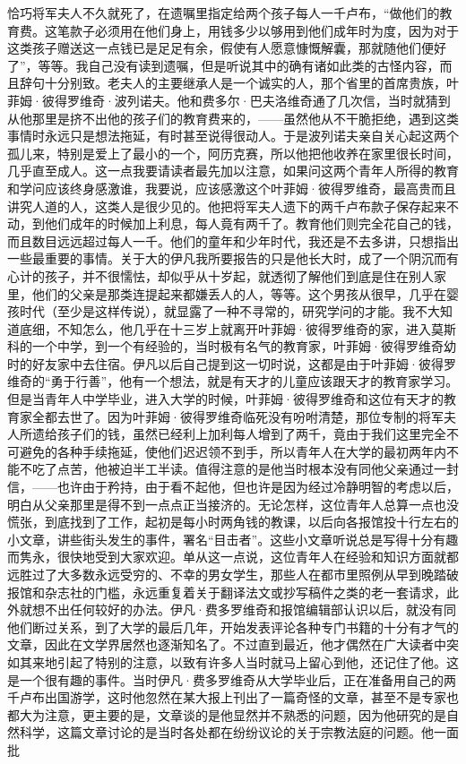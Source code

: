 \par 恰巧将军夫人不久就死了，在遗嘱里指定给两个孩子每人一千卢布，“做他们的教育费。这笔款子必须用在他们身上，用钱多少以够用到他们成年时为度，因为对于这类孩子赠送这一点钱已是足足有余，假使有人愿意慷慨解囊，那就随他们便好了”，等等。我自己没有读到遗嘱，但是听说其中的确有诸如此类的古怪内容，而且辞句十分别致。老夫人的主要继承人是一个诚实的人，那个省里的首席贵族，叶菲姆·彼得罗维奇·波列诺夫。他和费多尔·巴夫洛维奇通了几次信，当时就猜到从他那里是挤不出他的孩子们的教育费来的，——虽然他从不干脆拒绝，遇到这类事情时永远只是想法拖延，有时甚至说得很动人。于是波列诺夫亲自关心起这两个孤儿来，特别是爱上了最小的一个，阿历克赛，所以他把他收养在家里很长时间，几乎直至成人。这一点我要请读者最先加以注意，如果问这两个青年人所得的教育和学问应该终身感激谁，我要说，应该感激这个叶菲姆·彼得罗维奇，最高贵而且讲究人道的人，这类人是很少见的。他把将军夫人遗下的两千卢布款子保存起来不动，到他们成年的时候加上利息，每人竟有两千了。教育他们则完全花自己的钱，而且数目远远超过每人一千。他们的童年和少年时代，我还是不去多讲，只想指出一些最重要的事情。关于大的伊凡我所要报告的只是他长大时，成了一个阴沉而有心计的孩子，并不很懦怯，却似乎从十岁起，就透彻了解他们到底是住在别人家里，他们的父亲是那类连提起来都嫌丢人的人，等等。这个男孩从很早，几乎在婴孩时代（至少是这样传说），就显露了一种不寻常的，研究学问的才能。我不大知道底细，不知怎么，他几乎在十三岁上就离开叶菲姆·彼得罗维奇的家，进入莫斯科的一个中学，到一个有经验的，当时极有名气的教育家，叶菲姆·彼得罗维奇幼时的好友家中去住宿。伊凡以后自己提到这一切时说，这都是由于叶菲姆·彼得罗维奇的“勇于行善”，他有一个想法，就是有天才的儿童应该跟天才的教育家学习。但是当青年人中学毕业，进入大学的时候，叶菲姆·彼得罗维奇和这位有天才的教育家全都去世了。因为叶菲姆·彼得罗维奇临死没有吩咐清楚，那位专制的将军夫人所遗给孩子们的钱，虽然已经利上加利每人增到了两千，竟由于我们这里完全不可避免的各种手续拖延，使他们迟迟领不到手，所以青年人在大学的最初两年内不能不吃了点苦，他被迫半工半读。值得注意的是他当时根本没有同他父亲通过一封信，——也许由于矜持，由于看不起他，但也许是因为经过冷静明智的考虑以后，明白从父亲那里是得不到一点点正当接济的。无论怎样，这位青年人总算一点也没慌张，到底找到了工作，起初是每小时两角钱的教课，以后向各报馆投十行左右的小文章，讲些街头发生的事件，署名“目击者”。这些小文章听说总是写得十分有趣而隽永，很快地受到大家欢迎。单从这一点说，这位青年人在经验和知识方面就都远胜过了大多数永远受穷的、不幸的男女学生，那些人在都市里照例从早到晚踏破报馆和杂志社的门槛，永远重复着关于翻译法文或抄写稿件之类的老一套请求，此外就想不出任何较好的办法。伊凡·费多罗维奇和报馆编辑部认识以后，就没有同他们断过关系，到了大学的最后几年，开始发表评论各种专门书籍的十分有才气的文章，因此在文学界居然也逐渐知名了。不过直到最近，他才偶然在广大读者中突如其来地引起了特别的注意，以致有许多人当时就马上留心到他，还记住了他。这是一个很有趣的事件。当时伊凡·费多罗维奇从大学毕业后，正在准备用自己的两千卢布出国游学，这时他忽然在某大报上刊出了一篇奇怪的文章，甚至不是专家也都大为注意，更主要的是，文章谈的是他显然并不熟悉的问题，因为他研究的是自然科学，这篇文章讨论的是当时各处都在纷纷议论的关于宗教法庭的问题。他一面批